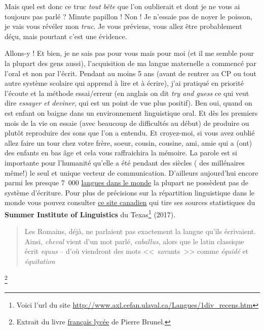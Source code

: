 \documentclass[12pt,a4paper]{book}
\begin{document}
Mais quel est donc ce truc \emph{tout bête} que l'on oublierait et dont je
ne vous ai toujours pas parlé ? Minute papillon ! Non ! Je n'essaie
pas de noyer le poisson, je vais vous révéler mon \emph{truc}. Je vous
préviens, vous allez être probablement déçu, mais pourtant c'est une
évidence. \par
Allons-y ! Et bien, je ne sais pas pour vous mais pour moi (et il me
semble pour la plupart des gens aussi), l'acquisition de ma langue
maternelle a commencé par l'oral et non par l'écrit. Pendant au moins
5 ans (avant de rentrer au CP ou tout autre système scolaire qui
apprend à lire et à écrire), j'ai pratiqué en priorité l'écoute et la
méthode essai/erreur (en anglais on dit \emph{try and guess} ce qui veut
dire \emph{essayer et deviner}, qui est un point de vue plus positif). Ben
oui, quand on est enfant on baigne dans un environnement linguistique
oral. Et dès les premiers mois de la vie on essaie (avec beaucoup de
difficultés au début) de produire ou plutôt reproduire des sons que
l'on a entendu. Et croyez-moi, si vous avez oublié allez faire un tour
chez votre frère, soeur, cousin, cousine, ami, amie qui a (ont) des
enfants en bas âge et cela vous raffraichira la mémoire. La parole est
si importante pour l'humanité qu'elle a été pendant des siècles ( des
millénaires même!) le seul et unique vecteur de
communication. D'ailleurs aujourd'hui encore parmi les presque 7~000
\href{http://www.museedelhomme.fr/fr/combien-langues-sont-parlees-monde}{langues dans le monde} la plupart ne possèdent pas de système
d'écriture. Pour plus de précisions sur la répartition linguistique
dans le monde vous pouvez consulter \href{http://www.axl.cefan.ulaval.ca/Langues/1div\_recens.htm}{ce site canadien} qui tire ses
sources statistiques du \textbf{Summer Institute of Linguistics} du
Texas\footnote{Voici l'url du site
  \url{http://www.axl.cefan.ulaval.ca/Langues/1div_recens.htm}}
(2017).\par


\begin{quote}
Les Romains, déjà, ne parlaient pas exactement la langue qu'ils
écrivaient. Ainsi, \emph{cheval} vient d'un mot parlé, \emph{caballus}, alors
que le latin classique écrit \emph{equus} -- d'où viendront des mots <<~savants~>> comme \emph{équidé} et \emph{équitation}
\end{quote}\footnote{Extrait du livre \href{https://www.amazon.fr/gp/product/2844100015/ref=as\_li\_tl?ie=UTF8\&camp=1642\&creative=6746\&creativeASIN=2844100015\&linkCode=as2\&tag=wwwbecomefree-21\&linkId=985f3a849fd44728e8480993cf2d5490}{français lycée} de Pierre Brunel.}
\end{document}
